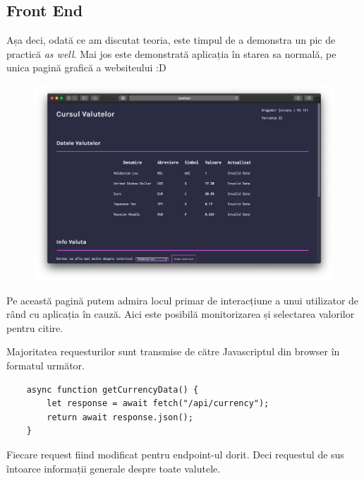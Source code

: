 \documentclass[12pt. a4paper]{report}
\begin{document}
\subsection{Front End}
Așa deci, odată ce am discutat teoria, este timpul de a demonstra un pic de practică \emph{as well}. Mai jos este demonstrată aplicația în starea sa normală, pe unica pagină grafică a websiteului :D

\begin{figure}[H]
\centering
	\includegraphics[width=1.0\textwidth]{homepage}
\end{figure}

Pe această pagină putem admira locul primar de interacțiune a unui utilizator de rând cu aplicația în cauză. Aici este posibilă monitorizarea și selectarea valorilor pentru citire.

Majoritatea requesturilor sunt transmise de către Javascriptul din browser în formatul următor.


\begin{verbatim}
    async function getCurrencyData() {
        let response = await fetch("/api/currency");
        return await response.json();
    }
\end{verbatim}

Fiecare request fiind modificat pentru endpoint-ul dorit. Deci requestul de sus întoarce informații generale despre toate valutele.
\end{document}
